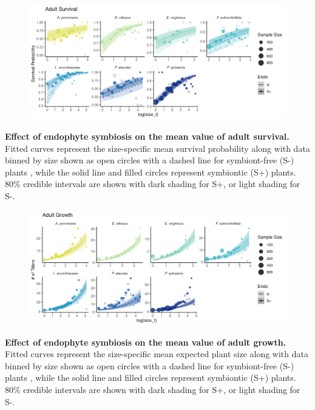 \documentclass[12pt]{article}
\begin{document}
\begin{figure}[H]
	\centering
	\includegraphics[width=.8\linewidth]{surv_meanplot.png}
\end{figure}
 \textbf{Effect of endophyte symbiosis on the mean value of adult survival.} Fitted curves represent the size-specific mean survival probability along with data binned by size shown as open circles with a dashed line for symbiont-free (S-) plants , while the solid line and filled circles represent symbiontic (S+) plants. 80\% credible intervals are shown with dark shading for  S+, or light shading for S-.
\begin{figure}[H]
	\centering
	\includegraphics[width=.8\linewidth]{grow_meanplot.png}
\end{figure}
 \textbf{Effect of endophyte symbiosis on the mean value of adult growth.} Fitted curves represent the size-specific mean expected plant size along with data binned by size shown as open circles with a dashed line for symbiont-free (S-) plants , while the solid line and filled circles represent symbiontic (S+) plants. 80\% credible intervals are shown with dark shading for  S+, or light shading for S-.
\newpage
\end{document}
